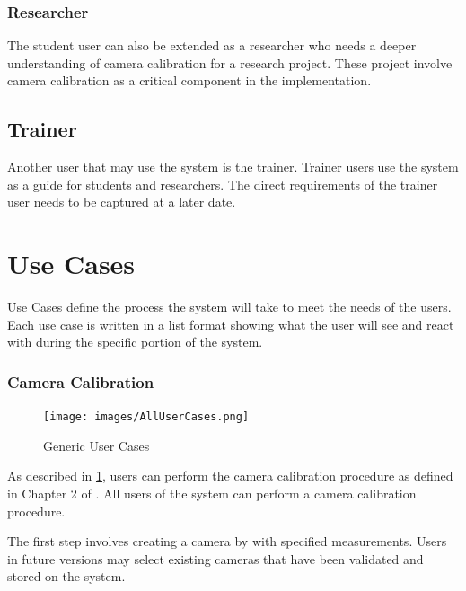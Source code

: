 \documentclass[11pt]{report}
\begin{document}
\subsubsection{Researcher}

The student user can also be extended as a researcher who needs a deeper understanding of camera calibration for a research project. These project involve camera calibration as a critical component in the implementation. 

\subsection{Trainer}

Another user that may use the system is the trainer. Trainer users use the system as a guide for students and researchers. The direct requirements of the trainer user needs to be captured at a later date.

\section{Use Cases}

Use Cases define the process the system will take to meet the needs of the users. Each use case is written in a list format showing what the user will see and react with during the specific portion of the system. 
\subsubsection{Camera Calibration}

\begin{figure}[htp]
\centering
\texttt{[image: images/AllUserCases.png]}
\caption{Generic User Cases}
\label{fig:guc}
\end{figure}


As described in \ref{fig:guc}, users can perform the camera calibration procedure as defined in Chapter 2 of \cite{CC}. All users of the system can perform a camera calibration procedure. 

The first step involves creating a camera by with specified measurements. Users in future versions may select existing cameras that have been validated and stored on the system. 
\end{document}
